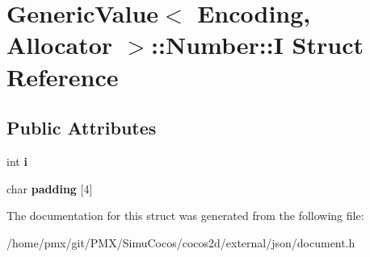 \hypertarget{structGenericValue_1_1Number_1_1I}{}\section{Generic\+Value$<$ Encoding, Allocator $>$\+:\+:Number\+:\+:I Struct Reference}
\label{structGenericValue_1_1Number_1_1I}
\subsection*{Public Attributes}
\begin{DoxyCompactItemize}
\item 
\mbox{\label{structGenericValue_1_1Number_1_1I_ae0b250dc448d284cf9019f3932bfc380}} 
int {\bfseries i}
\item 
\mbox{\label{structGenericValue_1_1Number_1_1I_a5b6ac51398ceb11c1abd733f0ae70461}} 
char {\bfseries padding} \mbox{[}4\mbox{]}
\end{DoxyCompactItemize}


The documentation for this struct was generated from the following file\+:\begin{DoxyCompactItemize}
\item 
/home/pmx/git/\+P\+M\+X/\+Simu\+Cocos/cocos2d/external/json/document.\+h\end{DoxyCompactItemize}
